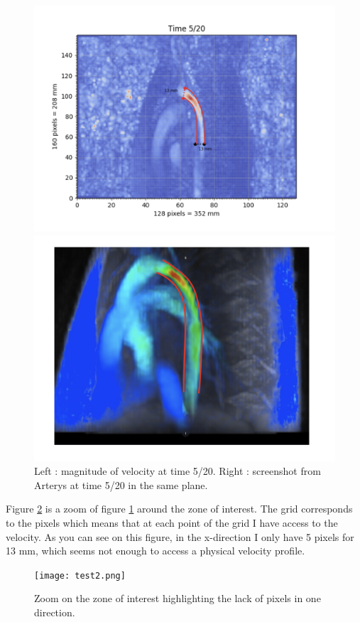 \documentclass{config}
\begin{document}
\begin{figure}[H]
\begin{minipage}{.48\textwidth}
\includegraphics[scale=0.28]{Figures001.png}
\end{minipage} \hfill
\begin{minipage}{.48\textwidth}
\includegraphics[scale=0.23]{Figures002.png}
\end{minipage}
\caption{Left : magnitude of velocity at time 5/20. Right : screenshot from Arterys at time 5/20 in the same plane.}
\label{unzoom}
\end{figure}

Figure \ref{zoom} is a zoom of figure \ref{unzoom} around the zone of interest. The grid corresponds to the pixels which means that at each point of the grid I have access to the velocity. As you can see on this figure, in the x-direction I only have 5 pixels for 13 mm, which seems not enough to access a physical velocity profile.

\begin{figure}[H]
\centering
\texttt{[image: test2.png]}
\caption{Zoom on the zone of interest highlighting the lack of pixels in one direction.}
\label{zoom}
\end{figure}
\end{document}
